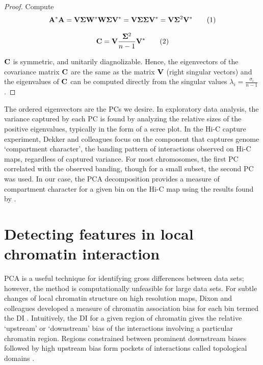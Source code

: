 \begin{proof}
  Compute
  \[
    \matr{A}^*\matr{A} =
    \matr{V\Sigma}\matr{W}^*\matr{W\Sigma}\matr{V}^* =
    \matr{V\Sigma\Sigma}\matr{V}^* =
    \matr{V}\matr{\Sigma}^2\matr{V}^* \addtag
  \]

  \[
    \matr{C} = \matr{V}\frac{\matr{\Sigma}^2}{n - 1}\matr{V}^* \addtag
  \]

  $\mathbf{C}$ is symmetric, and unitarily diagnolizable.  Hence, the eigenvectors of the covariance matrix $\mathbf{C}$ are the same as the
  matrix $\mathbf{V}$ (right singular vectors) and the eigenvalues of $\mathbf{C}$ can be computed directly from the singular values
  $\lambda_i = \frac{\sigma_i}{n - 1}$.
\end{proof}

The ordered eigenvectors are the \glspl{PC} we desire.  In exploratory data analysis, the variance captured by each \gls{PC} is found
by analyzing the relative sizes of the positive eigenvalues, typically in the form of a scree plot.  In the Hi-C capture experiment, Dekker
and colleagues \citep{dekker2012} focus on the component that captures genome `compartment character', the banding pattern of interactions
observed on Hi-C maps, regardless of captured variance.  For most chromosomes, the first \gls{PC} correlated with the observed banding, though
for a small subset, the second \gls{PC} was used.  In our case, the \gls{PCA} decomposition provides a measure of compartment character
for a given bin on the Hi-C map using the results found by \citet{dekker2012}.

\section*{Detecting features in local chromatin interaction}

\gls{PCA} is a useful technique for identifying gross differences between data sets; however, the method is computationally unfeasible for large
data sets.  For subtle changes of local chromatin structure on high resolution maps, Dixon and colleagues developed a measure of chromatin
association bias for each bin termed the \gls{DI} \citep{dixon2012}.  Intuitively, the \gls{DI} for a given region of chromatin gives the
relative `upstream' or `downstream' bias of the interactions involving a particular chromatin region.  Regions constrained between prominent
downstream biases followed by high upstream bias form pockets of interactions called topological domains \citep{dixon2012}.

